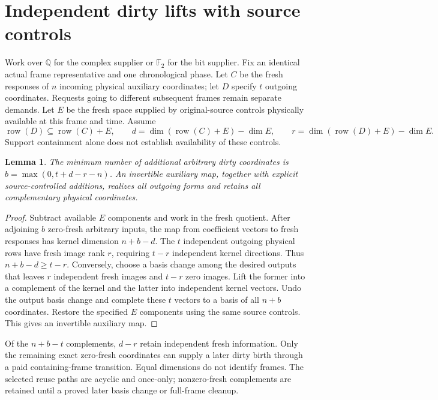 \documentclass[11pt]{article}
\newtheorem{lemma}{Lemma}
\begin{document}
\section{Independent dirty lifts with source controls}
Work over $\mathbb Q$ for the complex supplier or $\mathbb F_2$ for the
bit supplier. Fix an identical actual frame representative and one
chronological phase. Let $C$ be the fresh responses of $n$ incoming
physical auxiliary coordinates; let $D$ specify $t$ outgoing coordinates.
Requests going to different subsequent frames remain separate demands.
Let $E$ be the fresh space supplied by original-source controls physically
available at this frame and time. Assume
\[
 \operatorname{row}(D)\subseteq\operatorname{row}(C)+E,
 \qquad d=\dim(\operatorname{row}(C)+E)-\dim E,
 \qquad r=\dim(\operatorname{row}(D)+E)-\dim E.
\]
Support containment alone does not establish availability of these controls.
\begin{lemma}
The minimum number of additional arbitrary dirty coordinates is
$b=\max(0,t+d-r-n)$. An invertible auxiliary map, together with explicit
source-controlled additions, realizes all outgoing forms and retains
all complementary physical coordinates.
\end{lemma}
\begin{proof}
Subtract available $E$ components and work in the fresh quotient.
After adjoining $b$ zero-fresh arbitrary inputs, the map from coefficient
vectors to fresh responses has kernel dimension $n+b-d$. The $t$
independent outgoing physical rows have fresh image rank $r$, requiring
$t-r$ independent kernel directions. Thus $n+b-d\geq t-r$.
Conversely, choose a basis change among the desired outputs that leaves
$r$ independent fresh images and $t-r$ zero images. Lift the former into
a complement of the kernel and the latter into independent kernel
vectors. Undo the output basis change and complete these $t$ vectors to
a basis of all $n+b$ coordinates. Restore the specified $E$ components
using the same source controls. This gives an invertible auxiliary map.
\end{proof}
Of the $n+b-t$ complements, $d-r$ retain independent fresh information.
Only the remaining exact zero-fresh coordinates can supply a later dirty
birth through a paid containing-frame transition. Equal dimensions do
not identify frames. The selected reuse paths are acyclic and once-only;
nonzero-fresh complements are retained until a proved later basis change
or full-frame cleanup.
\end{document}
